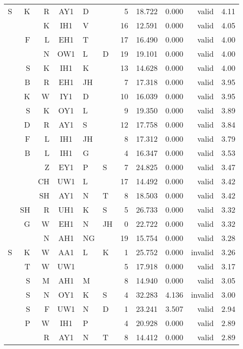 \begin{longtable}{r@{ }r@{ }r@{ }c@{ }l@{ }l@{ } rrrrr}
S &  K &  R & AY1 & D  &    &  5 & 18.722 & 0.000 &   valid & 4.11 \\
  &    &  K & IH1 & V  &    & 16 & 12.591 & 0.000 &   valid & 4.05 \\
  &  F &  L & EH1 & T  &    & 17 & 16.490 & 0.000 &   valid & 4.00 \\
  &    &  N & OW1 & L  & D  & 19 & 19.101 & 0.000 &   valid & 4.00 \\
  &  S &  K & IH1 & K  &    & 13 & 14.628 & 0.000 &   valid & 4.00 \\
  &  B &  R & EH1 & JH &    &  7 & 17.318 & 0.000 &   valid & 3.95 \\
  &  K &  W & IY1 & D  &    & 10 & 16.039 & 0.000 &   valid & 3.95 \\
  &  S &  K & OY1 & L  &    &  9 & 19.350 & 0.000 &   valid & 3.89 \\
  &  D &  R & AY1 & S  &    & 12 & 17.758 & 0.000 &   valid & 3.84 \\
  &  F &  L & IH1 & JH &    &  8 & 17.312 & 0.000 &   valid & 3.79 \\
  &  B &  L & IH1 & G  &    &  4 & 16.347 & 0.000 &   valid & 3.53 \\
  &    &  Z & EY1 & P  & S  &  7 & 24.825 & 0.000 &   valid & 3.47 \\
  &    & CH & UW1 & L  &    & 17 & 14.492 & 0.000 &   valid & 3.42 \\
  &    & SH & AY1 & N  & T  &  8 & 18.503 & 0.000 &   valid & 3.42 \\
  & SH &  R & UH1 & K  & S  &  5 & 26.733 & 0.000 &   valid & 3.32 \\
  &  G &  W & EH1 & N  & JH &  0 & 22.722 & 0.000 &   valid & 3.32 \\
  &    &  N & AH1 & NG &    & 19 & 15.754 & 0.000 &   valid & 3.28 \\
S &  K &  W & AA1 & L  & K  &  1 & 25.752 & 0.000 & invalid & 3.26 \\
  &  T &  W & UW1 &    &    &  5 & 17.918 & 0.000 &   valid & 3.17 \\
  &  S &  M & AH1 & M  &    &  8 & 14.940 & 0.000 &   valid & 3.05 \\
  &  S &  N & OY1 & K  & S  &  4 & 32.283 & 4.136 & invalid & 3.00 \\
  &  S &  F & UW1 & N  & D  &  1 & 23.241 & 3.507 &   valid & 2.94 \\
  &  P &  W & IH1 & P  &    &  4 & 20.928 & 0.000 &   valid & 2.89 \\
  &    &  R & AY1 & N  & T  &  8 & 14.412 & 0.000 &   valid & 2.89 \\

\end{longtable}
